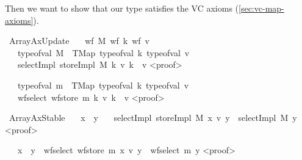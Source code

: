 Then we want to show that our type satisfies the VC axioms (\ref{sec:vc-map-axioms}).

\begin{isabellebody}
\isamarkupfalse%
\ ArrayAxUpdate{\isacharcolon}{\kern0pt}\isanewline
\ \ \ {\isachardoublequoteopen}wf\ M{\isachardoublequoteclose}\ {\isachardoublequoteopen}wf\ k{\isachardoublequoteclose}\ {\isachardoublequoteopen}wf\ v{\isachardoublequoteclose}\isanewline
\ \ \ {\isachardoublequoteopen}type{\isacharunderscore}{\kern0pt}of{\isacharunderscore}{\kern0pt}val\ M\ {\isacharequal}{\kern0pt}\ TMap\ {\isacharparenleft}{\kern0pt}type{\isacharunderscore}{\kern0pt}of{\isacharunderscore}{\kern0pt}val\ k{\isacharparenright}{\kern0pt}\ {\isacharparenleft}{\kern0pt}type{\isacharunderscore}{\kern0pt}of{\isacharunderscore}{\kern0pt}val\ v{\isacharparenright}{\kern0pt}{\isachardoublequoteclose}\isanewline
\ \ \ {\isachardoublequoteopen}selectImpl\ {\isacharparenleft}{\kern0pt}storeImpl\ M\ k\ v{\isacharparenright}{\kern0pt}\ k\ {\isacharequal}{\kern0pt}\ v{\isachardoublequoteclose}\isanewline
<proof>\isanewline

\isamarkupfalse\isanewline
\ \ \ {\isachardoublequoteopen}type{\isacharunderscore}{\kern0pt}of{\isacharunderscore}{\kern0pt}val\ m\ {\isacharequal}{\kern0pt}\ TMap\ {\isacharparenleft}{\kern0pt}type{\isacharunderscore}{\kern0pt}of{\isacharunderscore}{\kern0pt}val\ k{\isacharparenright}{\kern0pt}\ {\isacharparenleft}{\kern0pt}type{\isacharunderscore}{\kern0pt}of{\isacharunderscore}{\kern0pt}val\ v{\isacharparenright}{\kern0pt}{\isachardoublequoteclose}\isanewline
\ \ \ {\isachardoublequoteopen}wf{\isacharunderscore}{\kern0pt}select\ {\isacharparenleft}{\kern0pt}wf{\isacharunderscore}{\kern0pt}store\ m\ k\ v{\isacharparenright}{\kern0pt}\ k\ {\isacharequal}{\kern0pt}\ v{\isachardoublequoteclose}\isanewline
<proof>\isanewline
\end{isabellebody}


\begin{isabellebody}
\isamarkupfalse%
\ ArrayAxStable{\isacharcolon}{\kern0pt}\isanewline
\ \ \ {\isachardoublequoteopen}x\ {\isasymnoteq}\ y{\isachardoublequoteclose}\isanewline
\ \ \ {\isachardoublequoteopen}selectImpl\ {\isacharparenleft}{\kern0pt}storeImpl\ M\ x\ v{\isacharparenright}{\kern0pt}\ y\ {\isacharequal}{\kern0pt}\ selectImpl\ M\ y{\isachardoublequoteclose}\isanewline
<proof>\isanewline

\isamarkupfalse\isanewline
\ \ \ {\isachardoublequoteopen}x\ {\isacharequal}{\kern0pt}\ y\ {\isasymor}\ wf{\isacharunderscore}{\kern0pt}select\ {\isacharparenleft}{\kern0pt}wf{\isacharunderscore}{\kern0pt}store\ m\ x\ v{\isacharparenright}{\kern0pt}\ y\ {\isacharequal}{\kern0pt}\ wf{\isacharunderscore}{\kern0pt}select\ m\ y{\isachardoublequoteclose}\isanewline
<proof>
\end{isabellebody}

